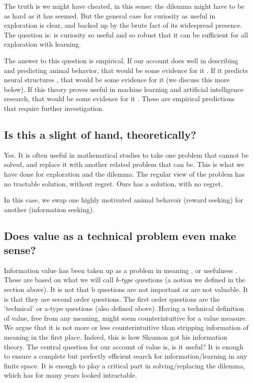 The truth is we might have cheated, in this sense: the dilemma might have to be as hard as it has seemed. But the general case for curiosity as useful in exploration is clear, and backed up by the brute fact of its widespread presence. The question is: is curiosity so useful and so robust that it can be sufficient for all exploration with learning. 

The answer to this question is empirical. If our account does well in describing and predicting animal behavior, that would be some evidence for it \citep{Sumner2019,Wang2019,Jaegle2019,Gottlieb2018,Kidd2015,Berlyne1950,Colas2020a,Rahnev2018,Wilson2020,CogliatiDezza2017b,Berger-Tal2014}. If it predicts neural structures \citep{Cisek2019,Kobayashi2019}, that would be some evidence for it (we discuss this more below). If this theory proves useful in machine learning and artificial intelligence research, that would be some evidence for it \citep{Burda2018,Schmidhuber1991,deAbril2018,Fister2019,Lehman2011a,Stanley2004a,Colas2020,Cully2015,Wilson2020,Pathak2019}. These are empirical predictions that require further investigation.


\subsection*{Is this a slight of hand, theoretically?}
Yes. It is often useful in mathematical studies to take one problem that cannot be solved, and replace it with another related problem that can be. This is what we have done for exploration and the dilemma. The regular view of the problem has no tractable solution, without regret. Ours has a solution, with no regret.

In this case, we swap one highly motivated animal behavoir (reward seeking) for another (information seeking).


\subsection*{Does value as a technical problem even make sense?}
Information value has been taken up as a problem in meaning  \citep{Kolchinsky2018}, or usefulness \citep{Tishby2000}. These are based on what we will call \textit{b-type} questions (a notion we defined in the section above). It is not that b questions are not important or are not valuable. It is that they are second order questions. The first order questions are the 'technical' or a-type questions (also defined above). 
Having a technical definition of value, free from any meaning, might seem counterintuitive for a value measure. We argue that it is not more or less counterintuitive than stripping information of meaning in the first  place. Indeed, this is how Shannon got his information theory. The central question for our account of value is, is it useful? It is enough to ensure a complete but perfectly efficient search for information/learning in any finite space. It is enough to play a critical part in solving/replacing the dilemma, which has for many years looked intractable. 


